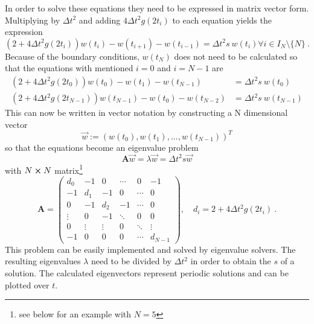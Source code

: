 \documentclass[11pt,a4paper]{article}
\begin{document}
In order to solve these equations they need to be expressed in matrix
vector form. Multiplying by $\Delta t^2$ and adding $4 \Delta t^2 g(2t_i)$ 
to each equation yields the expression
\begin{equation}
    \left( 2+4 \Delta t^2 g(2t_i) \right) w(t_i) - w(t_{i+1}) -w(t_{i-1}) 
    = \Delta t^2 s\ w(t_i) \forall i\in I_N \setminus \{N\} \ .
\end{equation}
Because of the boundary conditions, $w(t_N)$ does
not need to be calculated so that the equations with mentioned $i=0$ and $i=N-1$
are
\begin{align}
    \left( 2+4 \Delta t^2 g(2t_0) \right) w(t_0) - w(t_{1}) -w(t_{N-1}) 
    &= \Delta t^2 s\ w(t_0)  \\
    \left( 2+4 \Delta t^2 g(2t_{N-1}) \right) w(t_{N-1}) - w(t_0) -w(t_{N-2}) 
    &= \Delta t^2 s\ w(t_{N-1})
\end{align}
This can now be written in vector notation by constructing a
N dimensional vector 
\begin{equation}
    \vec{w}:=(w(t_0), w(t_1), ..., w(t_{N-1}))^T
\end{equation}
so that the equations become an eigenvalue problem
\begin{equation}
    \mathbf{A} \vec{w} = \lambda \vec{w} = \Delta t^2 s \vec{w}
\end{equation}
with $N\cross N$ matrix\footnote{see below for an example with $N=5$}
\begin{equation}
    \mathbf{A} = 
    \begin{pmatrix}
        d_0 & -1 & 0 & \cdots & 0 & -1 \\
        -1  & d_1   & -1    & 0 & \cdots & 0 \\
        0   &   -1  &   d_2 &   -1  & \cdots & 0 \\
        \vdots  & 0  & -1  & \ddots & 0 & 0 \\
        0   &   \vdots &  \vdots & 0 & \ddots & \vdots \\
        -1  &   0   &   0   &   0   & \cdots & d_{N-1}
    \end{pmatrix}, \quad d_i = 2+ 4 \Delta t^2 g(2t_i)\ .
\end{equation}
This problem can be easily implemented and solved by eigenvalue solvers.
The resulting eigenvalues $\lambda$ need to be divided by $\Delta t^2$
in order to obtain the $s$ of a solution. The calculated eigenvectors
represent periodic solutions and can be plotted over $t$.
\end{document}

